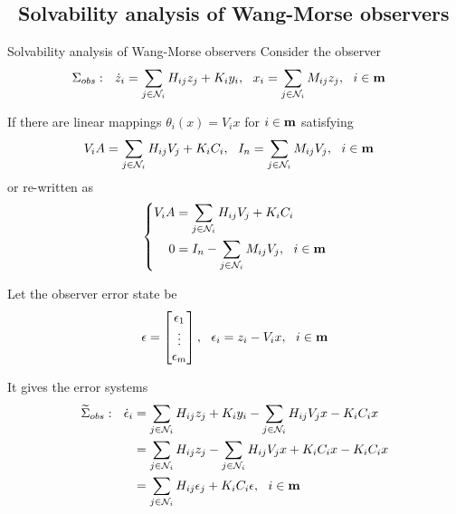 \documentclass{beamer}
\begin{document}
\subsection{~Solvability analysis of Wang-Morse observers}%

\begin{frame}{\color{blue} Solvability analysis of Wang-Morse observers}
Consider the observer
\begin{align*}
\Sigma_{obs}:~~ \dot{z}_{i}&=\sum_{j\in\mathcal{N}_{i}} H_{ij}z_{j} + K_{i}y_{i},~~ x_{i}=\sum_{j\in\mathcal{N}_{i}} M_{ij}z_{j},~~ i\in{\bf m}
\end{align*}


If there are {\color{red} linear mappings $\theta_{i}(x)=V_{i}x$} for $i\in{\bf m}$ satisfying
\begin{align*}
V_{i}A&=\sum_{j\in\mathcal{N}_{i}} H_{ij}V_{j} + K_{i}C_{i},~~
I_{n}=\sum_{j\in\mathcal{N}_{i}} M_{ij}V_{j},~~ i\in{\bf m}
\end{align*}
or re-written as
\begin{equation*}
\left\{\begin{split}
V_{i}A&=\sum_{j\in\mathcal{N}_{i}} H_{ij}V_{j} + K_{i}C_{i} \\
0&=I_{n}-\sum_{j\in\mathcal{N}_{i}} M_{ij}V_{j},~~ i\in{\bf m}
\end{split}\right.
\end{equation*}

\end{frame}



\begin{frame}{\color{blue} }

Let the observer error state be
\begin{equation*}
\epsilon=\begin{bmatrix} \epsilon_{1} \\ \vdots \\ \epsilon_{m} \\ \end{bmatrix},~~ \epsilon_{i}=z_{i}-V_{i}x,~~ i\in{\bf m}
\end{equation*}

It gives the error systems
\begin{align*}
\widetilde{\Sigma}_{obs}:~~ \dot{\epsilon}_{i}&=\sum_{j\in\mathcal{N}_{i}} H_{ij}z_{j} + K_{i}y_{i} - \sum_{j\in\mathcal{N}_{i}} H_{ij}V_{j}x - K_{i}C_{i}x \\
&=\sum_{j\in\mathcal{N}_{i}} H_{ij}z_{j}  - \sum_{j\in\mathcal{N}_{i}} H_{ij}V_{j}x + K_{i}C_{i}x - K_{i}C_{i}x \\
&=\sum_{j\in\mathcal{N}_{i}} H_{ij}\epsilon_{j} + K_{i}C_{i}\epsilon,~~ i\in{\bf m}
\end{align*}

\end{frame}
\end{document}
